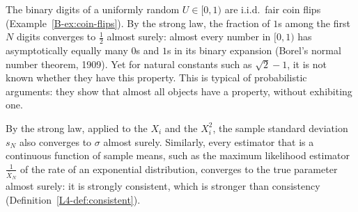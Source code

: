 \begin{example}\label{B-ex:normal-numbers}
    The binary digits of a uniformly random $U \in [0, 1)$ are i.i.d.\ fair coin flips (Example~\ref{B-ex:coin-flips}). By the strong law, the fraction of $1$s among the first $N$ digits converges to $\frac{1}{2}$ almost surely: almost every number in $[0, 1)$ has asymptotically equally many $0$s and $1$s in its binary expansion (Borel's normal number theorem, 1909). Yet for natural constants such as $\sqrt{2} - 1$, it is not known whether they have this property. This is typical of probabilistic arguments: they show that almost all objects have a property, without exhibiting one.
\end{example}

By the strong law, applied to the $X_i$ and the $X_i^2$, the sample standard deviation $s_N$ also converges to $\sigma$ almost surely. Similarly, every estimator that is a continuous function of sample means, such as the maximum likelihood estimator $\frac{1}{\bar X_N}$ of the rate of an exponential distribution, converges to the true parameter almost surely: it is strongly consistent, which is stronger than consistency (Definition~\ref{L4-def:consistent}).

